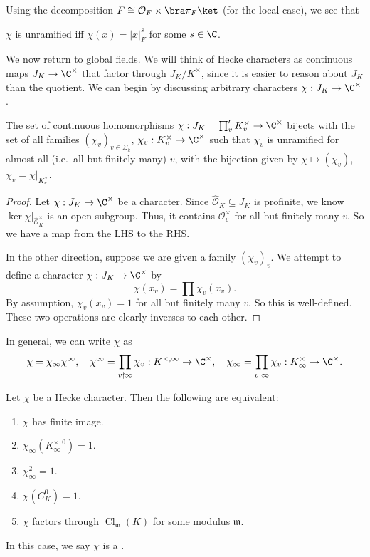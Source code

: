 \documentclass[a4paper]{article}
\DeclareMathOperator\Cl{\mathrm{Cl}}
\begin{document}
Using the decomposition $F \cong \mathcal{O}_F \times \bra \pi_F\ket$ (for the local case), we see that
\begin{prop}
  $\chi$ is unramified iff $\chi(x) = |x|_F^s$ for some $s \in \C$.\fakeqed
\end{prop}

We now return to global fields. We will think of Hecke characters as continuous maps $J_K \to \C^\times$ that factor through $J_K/K^\times$, since it is easier to reason about $J_K$ than the quotient. We can begin by discussing arbitrary characters $\chi: J_K \to \C^\times$.

\begin{prop}
  The set of continuous homomorphisms $\chi: J_K = \prod_v' K_v^\times \to \C^\times$ bijects with the set of all families $(\chi_v)_{v \in \Sigma_k}$, $\chi_v: K_v^\times \to \C^\times$ such that $\chi_v$ is unramified for almost all (i.e.\ all but finitely many) $v$, with the bijection given by $\chi \mapsto (\chi_v)$, $\chi_v = \chi|_{K_v^\times}$.
\end{prop}

\begin{proof}
  Let $\chi: J_K \to \C^\times$ be a character. Since $\hat{\mathcal{O}}_K \subseteq J_K$ is profinite, we know $\ker \chi|_{\hat{\mathcal{O}}_K^\times}$ is an open subgroup. Thus, it contains $\mathcal{O}_v^\times$ for all but finitely many $v$. So we have a map from the LHS to the RHS.

  In the other direction, suppose we are given a family $(\chi_v)_v$. We attempt to define a character $\chi: J_K \to \C^\times$ by
  \[
    \chi(x_v) = \prod \chi_v(x_v).
  \]
  By assumption, $\chi_v(x_v) = 1$ for all but finitely many $v$. So this is well-defined. These two operations are clearly inverses to each other.
\end{proof}
In general, we can write $\chi$ as 
\[
  \chi = \chi_\infty \chi^\infty,\quad \chi^\infty = \prod_{v \nmid \infty} \chi_v: K^{\times, \infty} \to \C^\times, \quad \chi_\infty = \prod_{v \mid \infty} \chi_v: K_\infty^\times \to \C^\times.
\]

\begin{lemma}
  Let $\chi$ be a Hecke character. Then the following are equivalent:
  \begin{enumerate}
    \item $\chi$ has finite image.
    \item $\chi_\infty(K_\infty^{\times, 0}) = 1$.
    \item $\chi_\infty^2 = 1$.
    \item $\chi(C_K^0) = 1$.
    \item $\chi$ factors through $\Cl_{\mathfrak{m}}(K)$ for some modulus $\mathfrak{m}$.
  \end{enumerate}
  In this case, we say $\chi$ is a .
\end{lemma}
\end{document}
